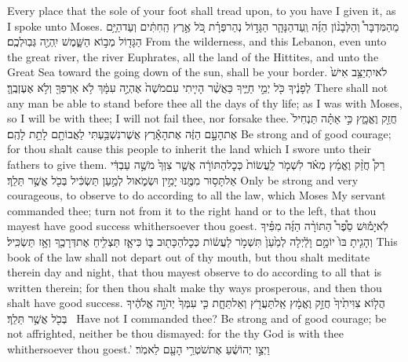 {Every place that the sole of your foot shall tread upon, to you have I given it, as I spoke unto Moses.}
{מֵהַמִּדְבָּר֩ וְהַלְּבָנ֨וֹן הַזֶּ֜ה וְֽעַד\maqqaf הַנָּהָ֧ר הַגָּד֣וֹל נְהַר\maqqaf פְּרָ֗ת כֹּ֚ל אֶ֣רֶץ הַֽחִתִּ֔ים וְעַד\maqqaf הַיָּ֥ם הַגָּד֖וֹל מְב֣וֹא הַשָּׁ֑מֶשׁ יִֽהְיֶ֖ה גְּבֽוּלְכֶֽם׃}
{From the wilderness, and this Lebanon, even unto the great river, the river Euphrates, all the land of the Hittites, and unto the Great Sea toward the going down of the sun, shall be your border.}
{לֹא\maqqaf יִתְיַצֵּ֥ב אִישׁ֙ לְפָנֶ֔יךָ כֹּ֖ל יְמֵ֣י חַיֶּ֑יךָ כַּאֲשֶׁ֨ר הָיִ֤יתִי עִם\maqqaf מֹשֶׁה֙ אֶהְיֶ֣ה עִמָּ֔ךְ לֹ֥א אַרְפְּךָ֖ וְלֹ֥א אֶעֶזְבֶֽךָּ׃}
{There shall not any man be able to stand before thee all the days of thy life; as I was with Moses, so I will be with thee; I will not fail thee, nor forsake thee.}
{חֲזַ֖ק וֶאֱמָ֑ץ כִּ֣י אַתָּ֗ה תַּנְחִיל֙ אֶת\maqqaf הָעָ֣ם הַזֶּ֔ה אֶת\maqqaf הָאָ֕רֶץ אֲשֶׁר\maqqaf נִשְׁבַּ֥עְתִּי לַאֲבוֹתָ֖ם לָתֵ֥ת לָהֶֽם׃}
{Be strong and of good courage; for thou shalt cause this people to inherit the land which I swore unto their fathers to give them.}
{רַק֩ חֲזַ֨ק וֶאֱמַ֜ץ מְאֹ֗ד לִשְׁמֹ֤ר לַֽעֲשׂוֹת֙ כְּכׇל\maqqaf הַתּוֹרָ֔ה אֲשֶׁ֤ר צִוְּךָ֙ מֹשֶׁ֣ה עַבְדִּ֔י אַל\maqqaf תָּס֥וּר מִמֶּ֖נּוּ יָמִ֣ין וּשְׂמֹ֑אול לְמַ֣עַן תַּשְׂכִּ֔יל בְּכֹ֖ל אֲשֶׁ֥ר תֵּלֵֽךְ׃}
{Only be strong and very courageous, to observe to do according to all the law, which Moses My servant commanded thee; turn not from it to the right hand or to the left, that thou mayest have good success whithersoever thou goest.}
{לֹֽא\maqqaf יָמ֡וּשׁ סֵ֩פֶר֩ הַתּוֹרָ֨ה הַזֶּ֜ה מִפִּ֗יךָ וְהָגִ֤יתָ בּוֹ֙ יוֹמָ֣ם וָלַ֔יְלָה לְמַ֙עַן֙ תִּשְׁמֹ֣ר לַעֲשׂ֔וֹת כְּכׇל\maqqaf הַכָּת֖וּב בּ֑וֹ כִּי\maqqaf אָ֛ז תַּצְלִ֥יחַ אֶת\maqqaf דְּרָכֶ֖ךָ וְאָ֥ז תַּשְׂכִּֽיל׃}
{This book of the law shall not depart out of thy mouth, but thou shalt meditate therein day and night, that thou mayest observe to do according to all that is written therein; for then thou shalt make thy ways prosperous, and then thou shalt have good success.}
{הֲל֤וֹא צִוִּיתִ֙יךָ֙ חֲזַ֣ק וֶאֱמָ֔ץ אַֽל\maqqaf תַּעֲרֹ֖ץ וְאַל\maqqaf תֵּחָ֑ת כִּ֤י עִמְּךָ֙ יְהֹוָ֣ה אֱלֹהֶ֔יךָ בְּכֹ֖ל אֲשֶׁ֥ר תֵּלֵֽךְ׃ \petucha }
{Have not I commanded thee? Be strong and of good courage; be not affrighted, neither be thou dismayed: for the \lord\space thy God is with thee whithersoever thou goest.’}
{וַיְצַ֣ו יְהוֹשֻׁ֔עַ אֶת\maqqaf שֹׁטְרֵ֥י הָעָ֖ם לֵאמֹֽר׃}
